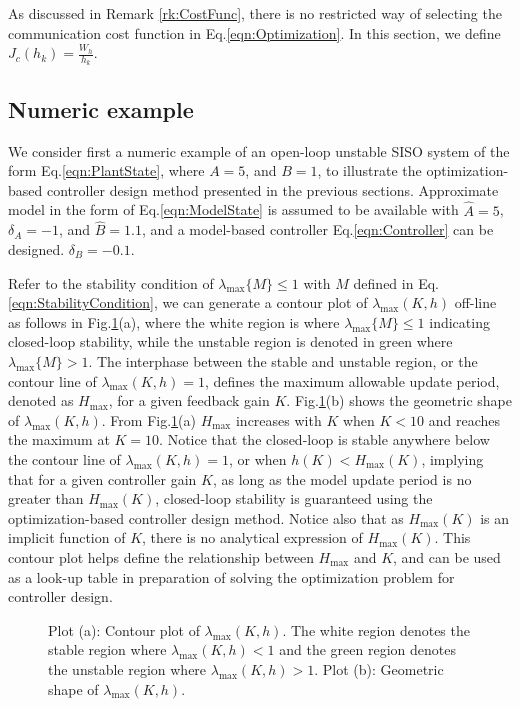 \documentclass[letterpaper, 10 pt, conference]{ieeeconf}\IEEEoverridecommandlockouts%
\begin{document}
As discussed in Remark \ref{rk:CostFunc}, there is no restricted way of selecting the communication cost function in Eq.\ref{eqn:Optimization}. In this section, we define $J_c(h_k) = \displaystyle{\frac{W_h}{h_k}}$.

\subsection{Numeric example}\label{sec:NumEx}
We consider first a numeric example of an open-loop unstable SISO system of the form Eq.\ref{eqn:PlantState}, where $A = 5$, and $B = 1$, to illustrate the optimization-based controller design method presented in the previous sections. Approximate model in the form of Eq.\ref{eqn:ModelState} is assumed to be available with $\widehat{A} = 5$, $\delta_A = -1$, and $\widehat{B} = 1.1$, and a model-based controller Eq.\ref{eqn:Controller} can be designed. $\delta_B = -0.1$.

Refer to the stability condition of $\lambda_{\max}\{M\} \leq 1$ with $M$ defined in Eq.\ref{eqn:StabilityCondition}, we can generate a contour plot of $\lambda_{\max}(K,h)$ off-line as follows in Fig.\ref{fig:SISO_contour}(a), where the white region is where $\lambda_{\max}\{M\} \leq 1$ indicating closed-loop stability, while the unstable region is denoted in green where $\lambda_{\max}\{M\} > 1$. The interphase between the stable and unstable region, or the contour line of $\lambda_{\max}(K,h) = 1$, defines the maximum allowable update period, denoted as $H_{\max}$, for a given feedback gain $K$. Fig.\ref{fig:SISO_contour}(b) shows the geometric shape of $\lambda_{\max}(K,h)$. From Fig.\ref{fig:SISO_contour}(a) $H_{\max}$ increases with $K$ when $K < 10$ and reaches the maximum at $K = 10$. Notice that the closed-loop is stable anywhere below the contour line of $\lambda_{\max}(K,h) = 1$, or when $h(K) < H_{\max}(K)$, implying that for a given controller gain $K$, as long as the model update period is no greater than $H_{\max}(K)$, closed-loop stability is guaranteed using the optimization-based controller design method. Notice also that as $H_{\max}(K)$ is an implicit function of $K$, there is no analytical expression of $H_{\max}(K)$. This contour plot helps define the relationship between $H_{\max}$ and $K$, and can be used as a look-up table in preparation of solving the optimization problem for controller design.

\begin{figure}[hptb]
  \centerline{\hspace{2mm}\hspace{-4mm}{\footnotesize (a)}
  \hspace{-4mm}{\footnotesize (b)}}
  \caption{Plot (a): Contour plot of $\lambda_{\max}(K,h)$. The white region denotes the stable region where $\lambda_{\max}(K,h) < 1$ and the green region denotes the unstable region where $\lambda_{\max}(K,h) > 1$. Plot (b): Geometric shape of $\lambda_{\max}(K,h)$.}\label{fig:SISO_contour}
\end{figure}
\end{document}
